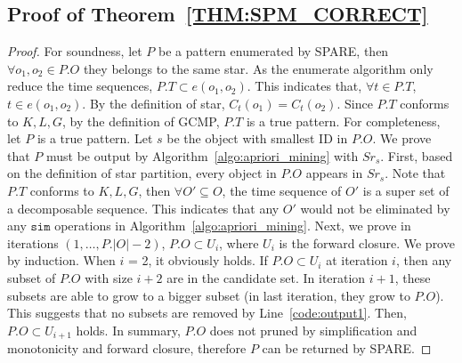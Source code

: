 \subsection{Proof of Theorem~\ref{THM:SPM_CORRECT}}
\begin{proof}
For soundness, let $P$ be a pattern enumerated by SPARE, then $\forall o_1, o_2 \in P.O$ they belongs to the same star. As the enumerate algorithm only reduce the time sequences, $P.T \subset e(o_1,o_2)$. This indicates that, $\forall t \in P.T$, $t\in e(o_1,o_2)$. By the definition of star, $C_t(o_1) = C_t(o_2)$. Since $P.T$ conforms to $K,L,G$,  by the definition of GCMP, $P.T$ is a true pattern.
For completeness, let $P$ is a true pattern. Let $s$ be the object with smallest ID in $P.O$. We prove that $P$ must be output by Algorithm~\ref{algo:apriori_mining} with $Sr_s$. 
First, based on the definition of star partition, every object in $P.O$ appears in $Sr_s$. Note that $P.T$ conforms to $K,L,G$, then $\forall O' \subseteq O$, the time sequence of $O'$ is a super set of a decomposable sequence. This indicates that any $O'$ would not be eliminated by any $\mathtt{sim}$ operations in Algorithm~\ref{algo:apriori_mining}.  Next, we prove in iterations $(1,\ldots,P.|O|-2)$, $P.O \subset U_i$, where $U_i$ is the forward closure. We prove by induction. When $i$ = 2, it obviously holds. If $P.O \subset U_i$ at iteration $i$, then any subset of $P.O$ with size $i+2$ are in the candidate set. In iteration $i+1$, these subsets are able to grow to a bigger subset (in last iteration, they grow to $P.O$). This suggests that no subsets are removed by Line~\ref{code:output1}. Then, $P.O \subset U_{i+1}$ holds.  In summary, $P.O$ does not pruned by simplification and monotonicity and forward closure, therefore $P$ can be returned by SPARE.
%

%
\end{proof}

